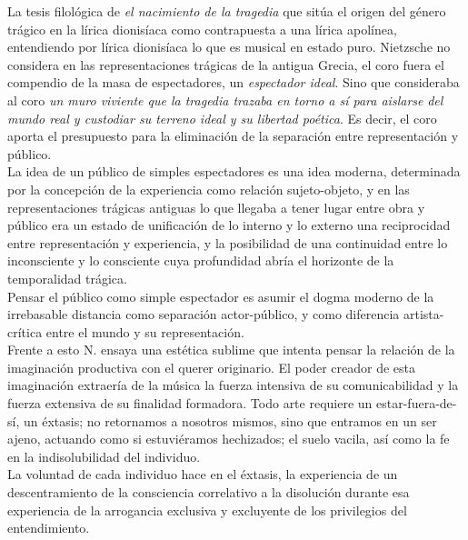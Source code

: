 \documentclass[a4paper, 10pt, twocolumn, spanish]{article}
\begin{document}
La tesis filológica de \emph{el nacimiento de la tragedia} que sitúa el
origen del género trágico en la lírica dionisíaca como contrapuesta a
una lírica apolínea, entendiendo por lírica dionisíaca lo que es
musical en estado puro. Nietzsche no considera en las representaciones
trágicas de la antigua Grecia, el coro fuera el compendio de la masa
de espectadores, un \emph{espectador ideal}. Sino que consideraba al coro
\emph{un muro viviente que la tragedia trazaba en torno a sí para aislarse}
\emph{del mundo real y custodiar su terreno ideal y su libertad
poética}. Es decir, el coro aporta el presupuesto para la eliminación
de la separación entre representación y público.\\[0pt]
La idea de un público de simples espectadores es una idea moderna,
determinada por la concepción de la experiencia como relación
sujeto-objeto, y en las representaciones trágicas antiguas lo que
llegaba a tener lugar entre obra y público era un estado de
unificación de lo interno y lo externo una reciprocidad entre
representación y experiencia, y la posibilidad de una continuidad
entre lo inconsciente y lo consciente cuya profundidad abría el
horizonte de la temporalidad trágica.\\[0pt]
Pensar el público como simple espectador es asumir el dogma moderno de
la irrebasable distancia como separación actor-público, y como
diferencia artista-crítica entre el mundo y su representación.\\[0pt]
Frente a esto N. ensaya una estética sublime que intenta pensar la
relación de la imaginación productiva con el querer originario. El
poder creador de esta imaginación extraería de la música la fuerza
intensiva de su comunicabilidad y la fuerza extensiva de su finalidad
formadora. Todo arte requiere un estar-fuera-de-sí, un éxtasis; no
retornamos a nosotros mismos, sino que entramos en un ser ajeno,
actuando como si estuviéramos hechizados; el suelo vacila, así como la
fe en la indisolubilidad del individuo.\\[0pt]
La voluntad de cada individuo hace en el éxtasis, la experiencia de un
descentramiento de la consciencia correlativo a la disolución durante
esa experiencia de la arrogancia exclusiva y excluyente de los
privilegios del entendimiento.\\[0pt]
\end{document}
